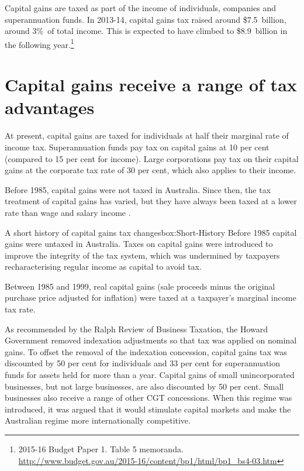 \documentclass{grattan}\usepackage[]{graphicx}\usepackage[]{color}
\begin{document}
Capital gains are taxed as part of the income of individuals, companies and superannuation funds. In 2013-14, capital gains tax raised around \$7.5~billion, around 3\%\ of total income. This is expected to have climbed to \$8.9~billion in the following year.\footnote{2015-16 Budget Paper 1. Table 5 memoranda. \url{http://www.budget.gov.au/2015-16/content/bp1/html/bp1_bs4-03.htm}}

\section{Capital gains receive a range of tax advantages}
At present, capital gains are taxed for individuals at half their marginal rate of income tax. Superannuation funds pay tax on capital gains at 10 per cent (compared to 15 per cent for income). Large corporations pay tax on their capital gains at the corporate tax rate of 30 per cent, which also applies to their income.

Before 1985, capital gains were not taxed in Australia. Since then, the tax treatment of capital gains has varied, but they have always been taxed at a lower rate than wage and salary income . 

\begin{smallbox}[!htb]{A short history of capital gains tax changes}{box:Short-History}
Before 1985 capital gains were untaxed in Australia. Taxes on capital gains were introduced to improve the integrity of the tax system, which was undermined by taxpayers recharacterising regular income as capital to avoid tax.   

Between 1985 and 1999, real capital gains (sale proceeds minus the original purchase price adjusted for inflation) were taxed at a taxpayer's marginal income tax rate. 

As recommended by the Ralph Review of Business Taxation, the Howard Government removed indexation adjustments so that tax was applied on nominal gains. To offset the removal of the indexation concession, capital gains tax was discounted by 50 per cent for individuals and 33 per cent for superannuation funds for assets held for more than a year. Capital gains of small unincorporated businesses, but not large businesses, are also discounted by 50 per cent. Small businesses also receive a range of other CGT concessions. When this regime was introduced, it was argued that it would stimulate capital markets and make the Australian regime more internationally competitive.
\end{smallbox}
\end{document}
